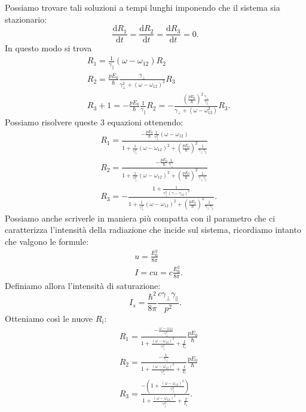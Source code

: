 Possiamo trovare tali soluzioni a tempi lunghi imponendo che il sistema sia stazionario:
\[
\frac{\text{d} R_1}{\text{d} t} =\frac{\text{d} R_2}{\text{d} t} = 
\frac{\text{d} R_3}{\text{d} t} =0
.\] 
In questo modo si trova 
\[\begin{aligned}
    &R_1 = \frac{1}{\gamma_\parallel}\left(\omega-\omega_{12}\right)R_2\\
    &R_2=\frac{pE_0}{\hbar }
    \frac{\gamma_\perp}{\gamma_\perp^2+\left(\omega-\omega_{12}\right)^2}R_3\\
    &R_3+1=-\frac{pE_0}{\hbar  }\frac{1}{\gamma_\parallel}R_2 =
    -\frac{\left(\frac{pE_0}{\hbar }\right)^2
	\frac{\gamma_\perp}
    {\gamma_\parallel}}{\gamma_\perp +\left(\omega-\omega_{12}^2\right)}R_3
.\end{aligned}\]
Possiamo risolvere queste 3 equazioni ottenendo:
\[\begin{aligned}
    &R_1= \frac{-\frac{pE_0}{\hbar  }\frac{1}{\gamma_\perp^2}
    \left(\omega-\omega_{12}\right)}
    {1+\frac{1}{\gamma_\perp^2}\left(\omega-\omega_{12}\right)^2 
    + \left(\frac{pE_0}{\hbar }\right)^2 
	\frac{1}{\gamma_\perp\gamma_\parallel}}\\
    &R_2 = \frac{- \frac{pE_0}{\hbar }\frac{1}{\gamma_\perp}}
{1+\frac{1}{\gamma_\perp^2}\left(\omega-\omega_{12}\right)^2 
    + \left(\frac{pE_0}{\hbar }\right)^2 
	\frac{1}{\gamma_\perp\gamma_\parallel}}\\
    &R_3 = - \frac{1+ \frac{1}{\gamma_\perp^2\left(\gamma-\gamma_{12}\right)^2}}
    {1+\frac{1}{\gamma_\perp^2}\left(\omega-\omega_{12}\right)^2 
    + \left(\frac{pE_0}{\hbar }\right)^2 
	\frac{1}{\gamma_\perp\gamma_\parallel}}
.\end{aligned}\]
Possiamo anche scriverle in maniera più compatta con il parametro che ci caratterizza l'intensità della radiazione che incide sul sistema, ricordiamo intanto che valgono le formule:
\[\begin{aligned}
&u = \frac{E_0^2}{8\pi}\\
&I = cu = c \frac{E_0^2}{8\pi}
.\end{aligned}\]
Definiamo allora l'intensità di saturazione:
\[
I_s = \frac{\hbar ^2}{8\pi}\frac{c\gamma_\perp\gamma_\parallel}{p^2}
.\] 
Otteniamo così le nuove $R_i$:
\[\begin{aligned}
    &R_1= \frac{-\frac{\omega-\omega_{12}}{\gamma_\perp^2}}
    {1+ \frac{\left(\omega-\omega_{12}\right)^2}{\gamma_\perp^2}
    + \frac{I}{I_s}} 
    \frac{pE_0}{\hbar }\\
    &R_2 = \frac{-\frac{1}{\gamma_\perp}}
    {1+ \frac{\left(\omega-\omega_{12}\right)^2}{\gamma_\perp^2}
    + \frac{I}{I_s}}
    \frac{pE_0}{\hbar }\\
    &R_3= 
    \frac{-\left(1+ 
    \frac{\left(\omega-\omega_{12}\right)^2}{\gamma_\perp^2}\right)}
    {1+ \frac{\left(\omega-\omega_{12}\right)^2}{\gamma_\perp^2}
    + \frac{I}{I_s}}
.\end{aligned}\]
